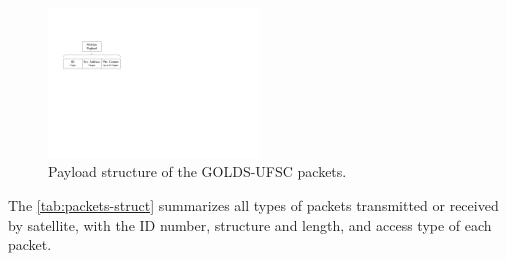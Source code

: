 \begin{figure}[!htb]
    \begin{center}
        \includegraphics[width=0.5\textwidth]{figures/floripasat-packet-structure.pdf}
        \caption{Payload structure of the GOLDS-UFSC packets.}
        \label{fig:fsat-pkt-structure}
    \end{center}
\end{figure}

The \autoref{tab:packets-struct} summarizes all types of packets transmitted or received by satellite, with the ID number, structure and length, and access type of each packet.


